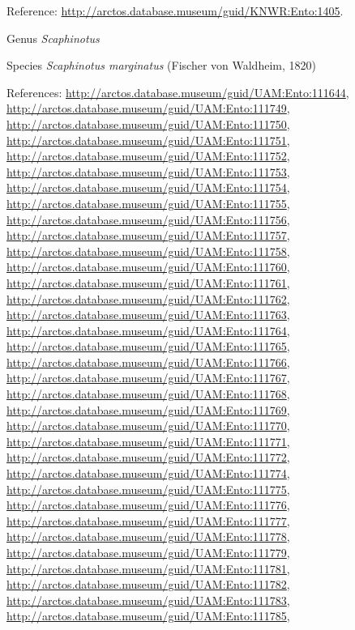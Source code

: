 \documentclass[9pt, article]{memoir}
\begin{document}
\begin{multicols}{2}
\vspace{6pt}Reference: 
\url{http://arctos.database.museum/guid/KNWR:Ento:1405}.

\vspace{6pt}\noindent\hspace{30pt}Genus \textit{Scaphinotus}


\vspace{6pt}\noindent\hspace{36pt}Species \textit{Scaphinotus marginatus} (Fischer von Waldheim, 1820)


\vspace{6pt}References: 
\url{http://arctos.database.museum/guid/UAM:Ento:111644}, 
\url{http://arctos.database.museum/guid/UAM:Ento:111749}, 
\url{http://arctos.database.museum/guid/UAM:Ento:111750}, 
\url{http://arctos.database.museum/guid/UAM:Ento:111751}, 
\url{http://arctos.database.museum/guid/UAM:Ento:111752}, 
\url{http://arctos.database.museum/guid/UAM:Ento:111753}, 
\url{http://arctos.database.museum/guid/UAM:Ento:111754}, 
\url{http://arctos.database.museum/guid/UAM:Ento:111755}, 
\url{http://arctos.database.museum/guid/UAM:Ento:111756}, 
\url{http://arctos.database.museum/guid/UAM:Ento:111757}, 
\url{http://arctos.database.museum/guid/UAM:Ento:111758}, 
\url{http://arctos.database.museum/guid/UAM:Ento:111760}, 
\url{http://arctos.database.museum/guid/UAM:Ento:111761}, 
\url{http://arctos.database.museum/guid/UAM:Ento:111762}, 
\url{http://arctos.database.museum/guid/UAM:Ento:111763}, 
\url{http://arctos.database.museum/guid/UAM:Ento:111764}, 
\url{http://arctos.database.museum/guid/UAM:Ento:111765}, 
\url{http://arctos.database.museum/guid/UAM:Ento:111766}, 
\url{http://arctos.database.museum/guid/UAM:Ento:111767}, 
\url{http://arctos.database.museum/guid/UAM:Ento:111768}, 
\url{http://arctos.database.museum/guid/UAM:Ento:111769}, 
\url{http://arctos.database.museum/guid/UAM:Ento:111770}, 
\url{http://arctos.database.museum/guid/UAM:Ento:111771}, 
\url{http://arctos.database.museum/guid/UAM:Ento:111772}, 
\url{http://arctos.database.museum/guid/UAM:Ento:111774}, 
\url{http://arctos.database.museum/guid/UAM:Ento:111775}, 
\url{http://arctos.database.museum/guid/UAM:Ento:111776}, 
\url{http://arctos.database.museum/guid/UAM:Ento:111777}, 
\url{http://arctos.database.museum/guid/UAM:Ento:111778}, 
\url{http://arctos.database.museum/guid/UAM:Ento:111779}, 
\url{http://arctos.database.museum/guid/UAM:Ento:111781}, 
\url{http://arctos.database.museum/guid/UAM:Ento:111782}, 
\url{http://arctos.database.museum/guid/UAM:Ento:111783}, 
\url{http://arctos.database.museum/guid/UAM:Ento:111785}, 

\end{multicols}
\end{document}

